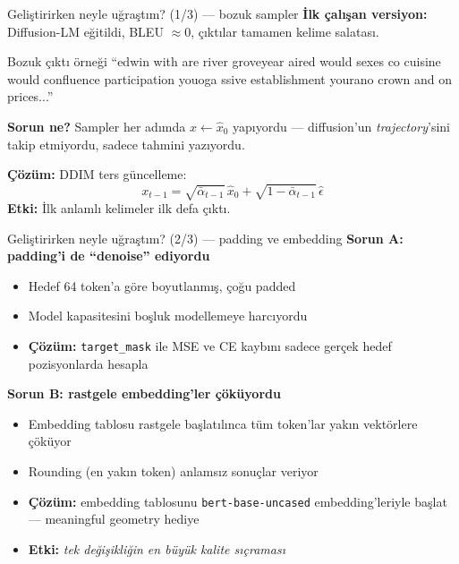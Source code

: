 \documentclass[10pt,aspectratio=169]{beamer}
\begin{document}
\begin{frame}{Geliştirirken neyle uğraştım? (1/3) --- bozuk sampler}
  \textbf{İlk çalışan versiyon:} Diffusion-LM eğitildi, BLEU \(\approx 0\),
  çıktılar tamamen kelime salatası.

  \begin{exampleblock}{Bozuk çıktı örneği}
    \footnotesize
    ``edwin with are river groveyear aired would sexes co cuisine would
    confluence participation youoga ssive establishment yourano crown and
    on prices...''
  \end{exampleblock}

  \vspace{0.3em}
  \textbf{Sorun ne?} Sampler her adımda
  $x \leftarrow \hat x_0$ yapıyordu --- diffusion'un \emph{trajectory}'sini
  takip etmiyordu, sadece tahmini yazıyordu.

  \vspace{0.3em}
  \textbf{Çözüm:} DDIM ters güncelleme:
  \[
    x_{t-1} = \sqrt{\bar\alpha_{t-1}}\, \hat x_0
            + \sqrt{1 - \bar\alpha_{t-1}}\, \hat\epsilon
  \]
  \textbf{Etki:} İlk anlamlı kelimeler ilk defa çıktı.
\end{frame}

\begin{frame}{Geliştirirken neyle uğraştım? (2/3) --- padding ve embedding}
  \textbf{Sorun A: padding'i de ``denoise'' ediyordu}
  \begin{itemize}
    \item Hedef 64 token'a göre boyutlanmış, çoğu padded
    \item Model kapasitesini boşluk modellemeye harcıyordu
    \item \textbf{Çözüm:} \texttt{target\_mask} ile MSE ve CE kaybını sadece
          gerçek hedef pozisyonlarda hesapla
  \end{itemize}

  \vspace{0.5em}
  \textbf{Sorun B: rastgele embedding'ler çöküyordu}
  \begin{itemize}
    \item Embedding tablosu rastgele başlatılınca tüm token'lar yakın
          vektörlere çöküyor
    \item Rounding (en yakın token) anlamsız sonuçlar veriyor
    \item \textbf{Çözüm:} embedding tablosunu \texttt{bert-base-uncased}
          embedding'leriyle başlat --- meaningful geometry hediye
    \item \textbf{Etki:} \emph{tek değişikliğin en büyük kalite sıçraması}
  \end{itemize}
\end{frame}
\end{document}
